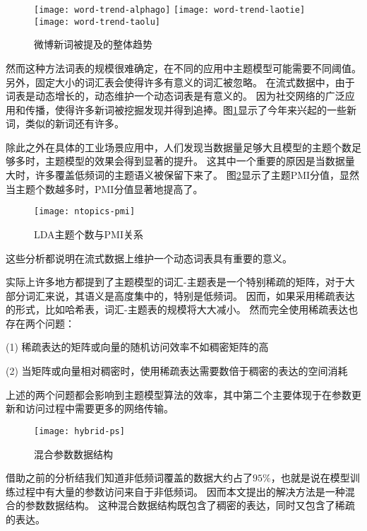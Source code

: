 \begin{figure}[htb]\centering
\texttt{[image: word-trend-alphago]}
\texttt{[image: word-trend-laotie]}
\texttt{[image: word-trend-taolu]}
\caption{微博新词被提及的整体趋势}
\label{fig:new-word-trend}       %
\end{figure}

然而这种方法词表的规模很难确定，在不同的应用中主题模型可能需要不同阈值。
另外，固定大小的词汇表会使得许多有意义的词汇被忽略。
在流式数据中，由于词表是动态增长的，动态维护一个动态词表是有意义的。
因为社交网络的广泛应用和传播，使得许多新词被挖掘发现并得到追捧。图\ref{fig:new-word-trend}显示了今年来兴起的一些新词，类似的新词还有许多。

除此之外在具体的工业场景应用中，人们发现当数据量足够大且模型的主题个数足够多时，主题模型的效果会得到显著的提升。
这其中一个重要的原因是当数据量大时，许多覆盖低频词的主题语义被保留下来了\cite{Peacock}。
图\ref{fig:ntopics-pmi}显示了主题PMI分值，显然当主题个数越多时，PMI分值显著地提高了。

\begin{figure}[htb]\centering
\texttt{[image: ntopics-pmi]}
\caption{LDA主题个数与PMI关系}
\label{fig:ntopics-pmi}       %
\end{figure}

这些分析都说明在流式数据上维护一个动态词表具有重要的意义。

实际上许多地方都提到了主题模型的词汇-主题表是一个特别稀疏的矩阵，对于大部分词汇来说，其语义是高度集中的，特别是低频词。
因而，如果采用稀疏表达的形式，比如哈希表，词汇-主题表的规模将大大减小。
然而完全使用稀疏表达也存在两个问题：

(1) 稀疏表达的矩阵或向量的随机访问效率不如稠密矩阵的高

(2) 当矩阵或向量相对稠密时，使用稀疏表达需要数倍于稠密的表达的空间消耗

上述的两个问题都会影响到主题模型算法的效率，其中第二个主要体现于在参数更新和访问过程中需要更多的网络传输。


\begin{figure}[htb]\centering
\texttt{[image: hybrid-ps]}
\caption{混合参数数据结构}
\label{fig:hybrid-ps}       %
\end{figure}

借助之前的分析结我们知道非低频词覆盖的数据大约占了$95\%$，也就是说在模型训练过程中有大量的参数访问来自于非低频词。
因而本文提出的解决方法是一种混合的参数数据结构。
这种混合数据结构既包含了稠密的表达，同时又包含了稀疏的表达。


